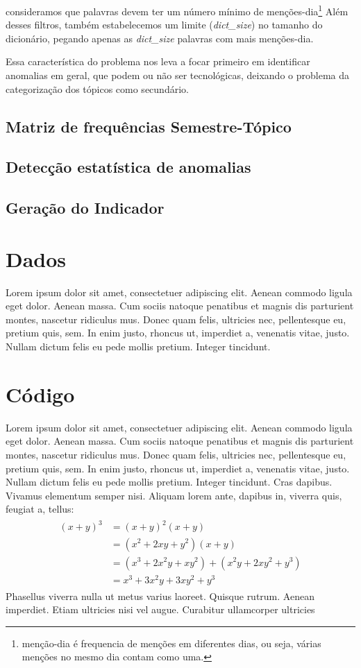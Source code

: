 \documentclass[paper=a4, fontsize=11pt]{scrartcl}
\numberwithin{equation}{section}		%
\numberwithin{figure}{section}			%
\numberwithin{table}{section}				%
\begin{document}
consideramos que palavras devem ter um número mínimo de menções-dia\footnote{menção-dia é frequencia de menções em diferentes dias, ou seja, várias menções no mesmo dia contam como uma.} Além desses filtros, também estabelecemos um limite (\emph{dict_size}) no tamanho do dicionário, pegando apenas as \emph{dict_size} palavras com mais menções-dia.


Essa característica do problema nos leva a focar primeiro em identificar anomalias em geral, que podem ou não ser tecnológicas, deixando o problema da categorização dos tópicos como secundário.


\subsection{Matriz de frequências Semestre-Tópico}
\subsection{Detecção estatística de anomalias}
\subsection{Geração do Indicador}
\section{Dados}\label{sec:dados}
Lorem ipsum dolor sit amet, consectetuer adipiscing elit. Aenean commodo ligula eget dolor. Aenean massa. Cum sociis natoque penatibus et magnis dis parturient montes, nascetur ridiculus mus. Donec quam felis, ultricies nec, pellentesque eu, pretium quis, sem. In enim justo, rhoncus ut, imperdiet a, venenatis vitae, justo. Nullam dictum felis eu pede mollis pretium. Integer tincidunt. 


\section{Código}
Lorem ipsum dolor sit amet, consectetuer adipiscing elit. Aenean commodo ligula eget dolor. Aenean massa. Cum sociis natoque penatibus et magnis dis parturient montes, nascetur ridiculus mus. Donec quam felis, ultricies nec, pellentesque eu, pretium quis, sem. In enim justo, rhoncus ut, imperdiet a, venenatis vitae, justo. Nullam dictum felis eu pede mollis pretium. Integer tincidunt. Cras dapibus. Vivamus elementum semper nisi. Aliquam lorem ante, dapibus in, viverra quis, feugiat a, tellus:
\begin{align} 
	\begin{split}
	(x+y)^3 	&= (x+y)^2(x+y)\\
					&=(x^2+2xy+y^2)(x+y)\\
					&=(x^3+2x^2y+xy^2) + (x^2y+2xy^2+y^3)\\
					&=x^3+3x^2y+3xy^2+y^3
	\end{split}					
\end{align}
Phasellus viverra nulla ut metus varius laoreet. Quisque rutrum. Aenean imperdiet. Etiam ultricies nisi vel augue. Curabitur ullamcorper ultricies 
\end{document}
